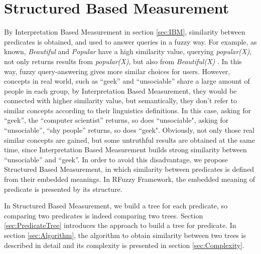 \section{Structured Based Measurement}
\label{sec:SBM}
By Interpretation Based Measurement in section \ref{sec:IBM}, similarity between predicates is obtained, and used to answer queries in a fuzzy way.  For example, as known, \textit{Beautiful} and \textit{Popular} have a high similarity value, querying \textit{popular(X)}, not only returns results from \textit{popular(X)}, but also from \textit{Beautiful(X)} . In this way, fuzzy query-answering gives more similar choices for users. However, concepts in real world, such as ``geek''  and ``unsociable'' share a large amount of people in each group, by Interpretation Based Measurement, they would be connected with higher similarity value, but semantically, they don't refer to similar concepts according to their linguistics definitions.  In this case, asking for ``geek'', the ``computer scientist''  returns, so does ``unsociable", asking for ``unsociable'', ``shy people'' returns, so does ``geek". Obviously, not only those real similar concepts are gained, but some untruthful results are obtained at the same time, since Interpretation Based Measurement builds strong similarity between ``unsociable'' and ``geek''. In order to avoid this disadvantage, we propose Structured Based Measurement, in which similarity between predicates is defined from their embedded meanings. In RFuzzy Framework, the embedded meaning of predicate is presented by its structure.

In Structured Based Measurement, we build a tree for each predicate, so comparing two predicates is indeed comparing two trees. Section \ref{sec:PredicateTree} introduces the approach to build a tree for predicate. In section \ref{sec:Algorithm}, the algorithm to obtain similarity between two trees is described in detail and its complexity is presented in section \ref{sec:Complexity}. 



